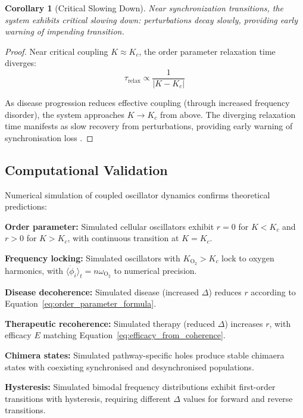 \documentclass[11pt,twocolumn,a4paper]{article}
\newtheorem{corollary}[theorem]{Corollary}
\theoremstyle{definition}
\theoremstyle{remark}
\begin{document}
\begin{corollary}[Critical Slowing Down]
\label{cor:critical_slowing}
Near synchronization transitions, the system exhibits critical slowing down: perturbations decay slowly, providing early warning of impending transition.
\end{corollary}

\begin{proof}
Near critical coupling $K \approx K_c$, the order parameter relaxation time diverges:
\begin{equation}
\tau_{\mathrm{relax}} \propto \frac{1}{|K - K_c|}
\label{eq:critical_slowing}
\end{equation}

As disease progression reduces effective coupling (through increased frequency disorder), the system approaches $K \to K_c$ from above. The diverging relaxation time manifests as slow recovery from perturbations, providing early warning of synchronisation loss \citep{scheffer2009early}.
\end{proof}

\subsection{Computational Validation}

Numerical simulation of coupled oscillator dynamics confirms theoretical predictions:

\textbf{Order parameter:} Simulated cellular oscillators exhibit $r = 0$ for $K < K_c$ and $r > 0$ for $K > K_c$, with continuous transition at $K = K_c$.

\textbf{Frequency locking:} Simulated oscillators with $K_{\mathrm{O_2}} > K_c$ lock to oxygen harmonics, with $\langle\dot{\phi}_i\rangle_t = n\omega_{\mathrm{O_2}}$ to numerical precision.

\textbf{Disease decoherence:} Simulated disease (increased $\Delta$) reduces $r$ according to Equation~\eqref{eq:order_parameter_formula}.

\textbf{Therapeutic recoherence:} Simulated therapy (reduced $\Delta$) increases $r$, with efficacy $E$ matching Equation~\eqref{eq:efficacy_from_coherence}.

\textbf{Chimera states:} Simulated pathway-specific holes produce stable chimaera states with coexisting synchronised and desynchronised populations.

\textbf{Hysteresis:} Simulated bimodal frequency distributions exhibit first-order transitions with hysteresis, requiring different $\Delta$ values for forward and reverse transitions.
\end{document}
